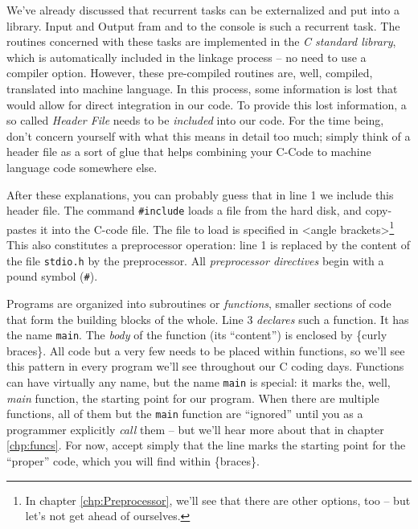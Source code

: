 We've already discussed that recurrent tasks can be externalized and put into a library. Input and Output fram and to the console is such a recurrent task. The routines concerned with these tasks are implemented in the \emph{C standard library}, which is automatically included in the linkage process -- no need to use a compiler option. However, these pre-compiled routines are, well, compiled, \ie translated into machine language. In this process, some information is lost that would allow for direct integration in our code. To provide this lost information, a so called \emph{Header File} needs to be \emph{included} into our code. For the time being, don't concern yourself with what this means in detail too much; simply think of a header file as a sort of glue that helps combining your C-Code to machine language code somewhere else.

After these explanations, you can probably guess that in line 1 we include this header file. The command \texttt{\#include} loads a file from the hard disk, and copy-pastes it into the C-code file. The file to load is specified in <angle brackets>\footnote{In chapter \ref{chp:Preprocessor}, we'll see that there are other options, too -- but let's not get ahead of ourselves.} This also constitutes a preprocessor operation: line 1 is replaced by the content of the file \texttt{stdio.h} by the preprocessor. All \emph{preprocessor directives} begin with a pound symbol (\texttt{\#}).

Programs are organized into subroutines or \emph{functions}, \ie smaller sections of code that form the building blocks of the whole. Line 3 \emph{declares} such a function. It has the name \texttt{main}. The \emph{body} of the function (\ie its \enquote{content}) is enclosed by \{curly braces\}. All code but a very few needs to be placed within functions, so we'll see this pattern in every program we'll see throughout our C coding days. Functions can have virtually any name, but the name \texttt{main} is special: it marks the, well, \emph{main} function, \ie the starting point for our program. When there are multiple functions, all of them but the \texttt{main} function are \enquote{ignored} until you as a programmer explicitly \emph{call} them -- but we'll hear more about that in chapter \ref{chp:funcs}. For now, accept simply that the line  marks the starting point for the \enquote{proper} code, which you will find within \{braces\}.

